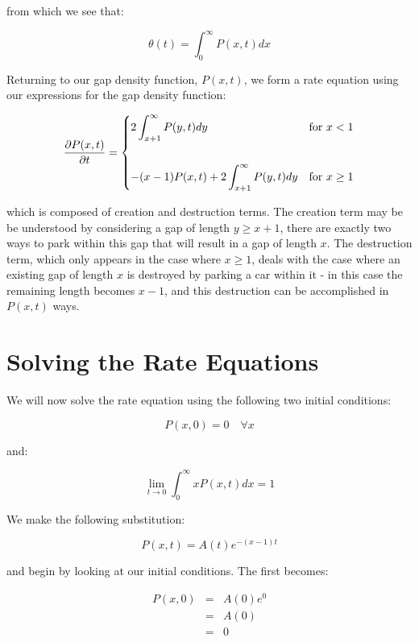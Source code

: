 from which we see that: \bigskip

\[
	\theta(t) = \int_{0}^{\infty} P(x, t) dx
\]\medskip

Returning to our gap density function, $P(x, t)$, we form a rate equation using our 
expressions for the gap density function: \bigskip

\begin{eqnarray*}
	\frac{\partial P(x, t)}{\partial t} = 
	\begin{dcases}
		2 \int_{x + 1}^{\infty} P(y, t) dy                     & \text{for } x < 1 \\\\
		-(x - 1) P(x, t) + 2 \int_{x + 1}^{\infty} P(y, t) dy  & \text{for } x \geq 1
	\end{dcases}
\end{eqnarray*}\medskip

which is composed of creation and destruction terms. The creation term may be be 
understood by considering a gap of length $y \geq x + 1$, there are exactly two 
ways to park within this gap that will result in a gap of length $x$. The 
destruction term, which only appears in the case where $x \geq 1$, deals with 
the case where an existing gap of length $x$ is destroyed by parking a car within 
it - in this case the remaining length becomes $x - 1$, and this destruction can be 
accomplished in $P(x, t)$ ways. \bigskip










\section{Solving the Rate Equations}

We will now solve the rate equation using the following two initial conditions: \bigskip

\[
	P(x, 0) = 0 \quad \forall x
\]\medskip

and: \bigskip

\[
	\lim_{t \to 0} \int_{0}^{\infty} x P(x, t) dx = 1
\]\medskip

We make the following substitution: \bigskip

\[
	P(x, t) = A(t) e^{-(x - 1)t}
\]\medskip

and begin by looking at our initial conditions. The first becomes: \bigskip

\begin{eqnarray*}
	P(x, 0) & = & A(0) e^0 \\
			& = & A(0) \\
			& = & 0
\end{eqnarray*}\medskip

